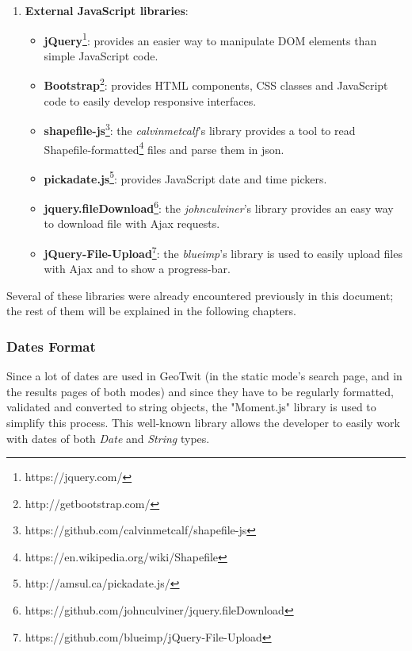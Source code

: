 \documentclass[a4paper,11pt]{report}
\begin{document}
\begin{enumerate}
	\item \textbf{External JavaScript libraries}:
	\begin{itemize}
		\item \textbf{jQuery}\footnote{https://jquery.com/}: provides an easier way to manipulate DOM elements than simple JavaScript code.
		\item \textbf{Bootstrap}\footnote{http://getbootstrap.com/}: provides HTML components, CSS classes and JavaScript code to easily develop responsive interfaces.
		\item \textbf{shapefile-js}\footnote{https://github.com/calvinmetcalf/shapefile-js}: the \emph{calvinmetcalf}'s library provides a tool to read Shapefile-formatted\footnote{https://en.wikipedia.org/wiki/Shapefile} files and parse them in json.
		\item \textbf{pickadate.js}\footnote{http://amsul.ca/pickadate.js/}: provides JavaScript date and time pickers.
		\item \textbf{jquery.fileDownload}\footnote{https://github.com/johnculviner/jquery.fileDownload}:  the \emph{johnculviner}'s library provides an easy way to download file with Ajax requests.
		\item \textbf{jQuery-File-Upload}\footnote{https://github.com/blueimp/jQuery-File-Upload}: the \emph{blueimp}'s library is used to easily upload files with Ajax and to show a progress-bar.
	\end{itemize}
\end{enumerate}

Several of these libraries were already encountered previously in this document; the rest of them will be explained in the following chapters.
\bigskip

\subsubsection{Dates Format}
Since a lot of dates are used in GeoTwit (in the static mode's search page, and in the results pages of both modes) and since they have to be regularly formatted, validated and converted to string objects, the "Moment.js" library is used to simplify this process. This well-known library allows the developer to easily work with dates of both \emph{Date} and \emph{String} types.
\newpage
\end{document}
